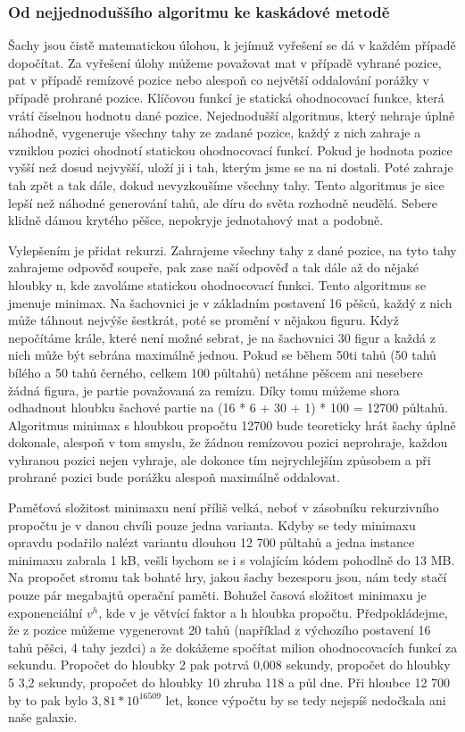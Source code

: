 \documentclass[11pt, titlepage]{article}
\begin{document}
\subsubsection{Od nejjednoduššího algoritmu ke kaskádové metodě}
Šachy jsou čistě matematickou úlohou, k jejímuž vyřešení se dá v každém případě dopočítat. Za vyřešení úlohy můžeme považovat mat v případě vyhrané pozice, pat v případě remízové pozice nebo alespoň co největší oddalování porážky v případě prohrané pozice. Klíčovou funkcí je statická ohodnocovací funkce, která vrátí číselnou hodnotu dané pozice. Nejednodušší algoritmus, který nehraje úplně náhodně, vygeneruje všechny tahy ze zadané pozice, každý z nich zahraje a vzniklou pozici ohodnotí statickou ohodnocovací funkcí. Pokud je hodnota pozice vyšší než dosud nejvyšší, uloží ji i tah, kterým jsme se na ni dostali. Poté zahraje tah zpět a tak dále, dokud nevyzkoušíme všechny tahy. Tento algoritmus je sice lepší než náhodné generování tahů, ale díru do světa rozhodně neudělá. Sebere klidně dámou krytého pěšce, nepokryje jednotahový mat a podobně.

Vylepšením je přidat rekurzi. Zahrajeme všechny tahy z dané pozice, na tyto tahy zahrajeme odpověď soupeře, pak zase naší odpověď a tak dále až do nějaké hloubky n, kde zavoláme statickou ohodnocovací funkci. Tento algoritmus se jmenuje minimax. Na šachovnici je v základním postavení 16 pěšců, každý z nich může táhnout nejvýše šestkrát, poté se promění v nějakou figuru. Když nepočítáme krále, které není možné sebrat, je na šachovnici 30 figur a každá z nich může být sebrána maximálně jednou. Pokud se během 50ti tahů (50 tahů bílého a 50 tahů černého, celkem 100 půltahů) netáhne pěšcem ani nesebere žádná figura, je partie považovaná za remízu. Díky tomu můžeme shora odhadnout hloubku šachové partie na (16 * 6 + 30 + 1) * 100 = 12700 půltahů. Algoritmus minimax s hloubkou propočtu 12700 bude teoreticky hrát šachy úplně dokonale, alespoň v tom smyslu, že žádnou remízovou pozici neprohraje, každou vyhranou pozici nejen vyhraje, ale dokonce tím nejrychlejším způsobem a při prohrané pozici bude porážku alespoň maximálně oddalovat.

Paměťová složitost minimaxu není příliš velká, neboť v zásobníku rekurzivního propočtu je v danou chvíli pouze jedna varianta. Kdyby se tedy minimaxu opravdu podařilo nalézt variantu dlouhou 12 700 půltahů a jedna instance minimaxu zabrala 1 kB, vešli bychom se i s volajícím kódem pohodlně do 13 MB. Na propočet stromu tak bohaté hry, jakou šachy bezesporu jsou, nám tedy stačí pouze pár megabajtů operační paměti. Bohužel časová složitost minimaxu je exponenciální \begin{math}v^h\end{math}, kde v je větvící faktor a h hloubka propočtu. Předpokládejme, že z pozice můžeme vygenerovat 20 tahů (například z výchozího postavení 16 tahů pěšci, 4 tahy jezdci) a že dokážeme spočítat milion ohodnocovacích funkcí za sekundu. Propočet do hloubky 2 pak potrvá 0,008 sekundy, propočet do hloubky 5 3,2 sekundy, propočet do hloubky 10 zhruba 118 a půl dne. Při hloubce 12 700 by to pak bylo \begin{math}3,81 * 10^16509\end{math} let, konce výpočtu by se tedy nejspíš nedočkala ani naše galaxie.
\end{document}
